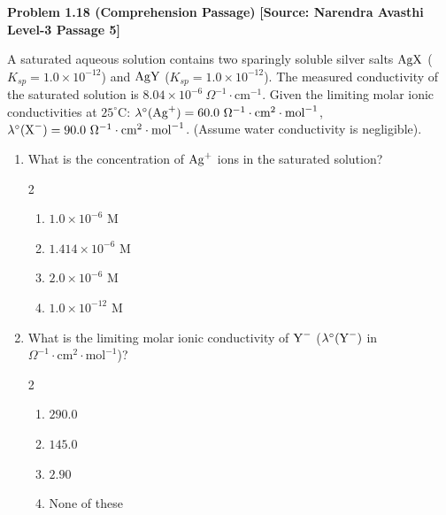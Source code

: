 \begin{problembox}
\textbf{Problem 1.18 (Comprehension Passage)} \hfill \textbf{[Source: Narendra Avasthi Level-3 Passage 5]}

A saturated aqueous solution contains two sparingly soluble silver salts $\ce{AgX}$ ($K_{sp} = 1.0 \times 10^{-12}$) and $\ce{AgY}$ ($K_{sp} = 1.0 \times 10^{-12}$). The measured conductivity of the saturated solution is $8.04 \times 10^{-6}\ \Omega^{-1}\cdot\text{cm}^{-1}$.
Given the limiting molar ionic conductivities at $25^\circ\text{C}$:
$\lambda^\circ(\ce{Ag+}) = 60.0\ \Omega^{-1}\cdot\text{cm}^2\cdot\text{mol}^{-1}$,
$\lambda^\circ(\ce{X-}) = 90.0\ \Omega^{-1}\cdot\text{cm}^2\cdot\text{mol}^{-1}$.
(Assume water conductivity is negligible).

\begin{enumerate}[label=\textbf{Part \arabic*:}]
    \item What is the concentration of $\ce{Ag+}$ ions in the saturated solution?
    \begin{multicols}{2}
    \begin{enumerate}[label=(\alph*)]
        \item $1.0 \times 10^{-6}\text{ M}$
        \item $1.414 \times 10^{-6}\text{ M}$
        \item $2.0 \times 10^{-6}\text{ M}$
        \item $1.0 \times 10^{-12}\text{ M}$
    \end{enumerate}
    \end{multicols}
    
    \item What is the limiting molar ionic conductivity of $\ce{Y-}$ ($\lambda^\circ(\ce{Y-})$ in $\Omega^{-1}\cdot\text{cm}^2\cdot\text{mol}^{-1}$)?
    \begin{multicols}{2}
    \begin{enumerate}[label=(\alph*)]
        \item $290.0$
        \item $145.0$
        \item $2.90$
        \item None of these
    \end{enumerate}
    \end{multicols}
\end{enumerate}
\end{problembox}
